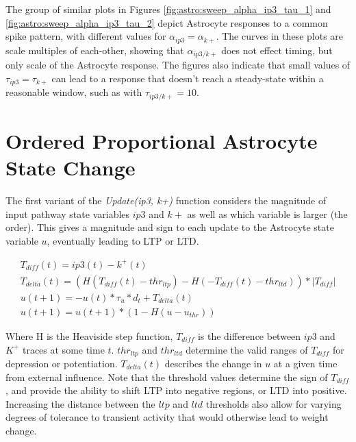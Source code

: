     The group of similar plots in Figures \ref{fig:astro:sweep_alpha_ip3_tau_1} and
    \ref{fig:astro:sweep_alpha_ip3_tau_2} depict Astrocyte responses to a common
    spike pattern, with different values for $\alpha_{ip3}=\alpha_{k+}$. The
    curves in these plots are scale multiples of each-other, showing that
    $\alpha_{ip3/k+}$ does not effect timing, but only scale of the Astrocyte
    response. The figures also indicate that small values of
    $\tau_{ip3}=\tau_{k+}$ can lead to a response that doesn't reach a
    steady-state within a reasonable window, such as with $\tau_{ip3/k+} = 10$.

    
    \section{Ordered Proportional Astrocyte State Change}

    The first variant of the \emph{Update(ip3, k+)} function considers the
    magnitude of input pathway state variables $ip3$ and $k+$ as well as which
    variable is larger (the order). This gives a magnitude and sign to each
    update to the Astrocyte state variable $u$, eventually leading to LTP or
    LTD.

    \begin{align}
      T_{diff}(t) = ip3(t) - k^+(t) \\
      T_{delta}(t) = (H(T_{diff}(t) - thr_{ltp}) - H(-T_{diff}(t) - thr_{ltd})) * |T_{diff}| \\
      u(t+1) = -u(t) * \tau_{u} * d_t + T_{delta}(t) \label{eq:astro:rate-u} \\
      u(t+1) = u(t+1) * (1 - H(u - u_{thr})) \label{eq:astro:u-reset}
    \end{align}

    Where H is the Heaviside step function, $T_{diff}$ is the difference between
    $ip3$ and $K^+$ traces at some time $t$. $thr_{ltp}$ and $thr_{ltd}$ determine the valid
    ranges of $T_{diff}$ for depression or potentiation. $T_{delta}(t)$ describes
    the change in $u$ at a given time from external influence. Note that the
    threshold values determine the sign of $T_{diff}$, and provide the ability
    to shift LTP into negative regions, or LTD into positive. Increasing the
    distance between the $ltp$ and $ltd$ thresholds also allow for varying
    degrees of tolerance to transient activity that would otherwise lead to
    weight change.


